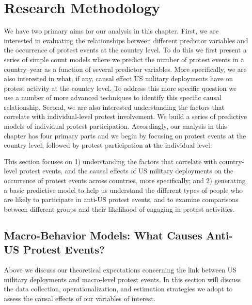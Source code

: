\section*{Research Methodology}

We have two primary aims for our analysis in this chapter. First, we are interested in evaluating the relationships between different predictor variables and the occurrence of protest events at the country level. To do this we first present a series of simple count models where we predict the number of protest events in a country--year as a function of several predictor variables. More specifically, we are also interested in what, if any, causal effect US military deployments have on protest activity at the country level. To address this more specific question we use a number of more advanced techniques to identify this specific causal relationship. Second, we are also interested understanding the factors that correlate with individual-level protest involvement. We build a series of predictive models of individual protest participation. Accordingly, our analysis in this chapter has four primary parts and we begin by focusing on protest events at the country level, followed by protest participation at the individual level. 

This section focuses on 1) understanding the factors that correlate with country-level protest events, and the causal effects of US military deployments on the occurrence of protest events across countries, more specifically; and 2) generating a basic predictive model to help us understand the different types of people who are likely to participate in anti-US protest events, and to examine comparisons between different groups and their likelihood of engaging in protest activities.



\subsection*{Macro-Behavior Models: What Causes Anti-US Protest Events?}

Above we discuss our theoretical expectations concerning the link between US military deployments and macro-level protest events. In this section will discuss the data collection, operationalization, and estimation strategies we adopt to assess the causal effects of our variables of interest. 

